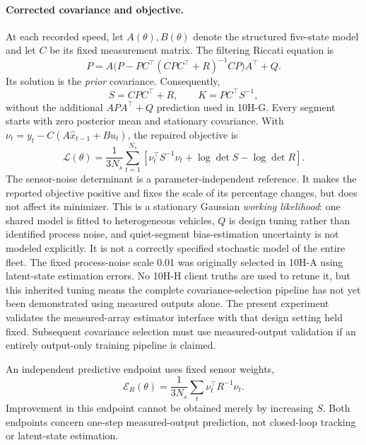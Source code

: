 \paragraph{Corrected covariance and objective.}
At each recorded speed, let $A(\theta),B(\theta)$ denote the structured
five-state model and let $C$ be its fixed measurement matrix. The filtering
Riccati equation is
\begin{equation}
 P=A\bigl(P-PC^\top(CPC^\top+R)^{-1}CP\bigr)A^\top+Q.
\end{equation}
Its solution is the \emph{prior} covariance. Consequently,
\begin{equation}
 S=CPC^\top+R,\qquad K=PC^\top S^{-1},
\end{equation}
without the additional $APA^\top+Q$ prediction used in 10H-G.
Every segment starts with zero posterior mean and stationary covariance.
With $\nu_t=y_t-C(A\hat x_{t-1}+Bu_t)$, the repaired objective is
\begin{equation}
 \mathcal L(\theta)=\frac{1}{3N_s}
 \sum_{t=1}^{N_s}
 \left[\nu_t^\top S^{-1}\nu_t+\log\det S-\log\det R\right].
 \label{eq:10hh-likelihood}
\end{equation}
The sensor-noise determinant is a parameter-independent reference. It makes
the reported objective positive and fixes the scale of its percentage changes,
but does not affect its minimizer. This is a stationary Gaussian
\emph{working likelihood}: one shared model is fitted to heterogeneous
vehicles, $Q$ is design tuning rather than identified process noise, and
quiet-segment bias-estimation uncertainty is not modeled explicitly.
It is not a correctly specified stochastic model of the entire fleet.
The fixed process-noise scale 0.01 was originally selected in 10H-A using
latent-state estimation errors. No 10H-H client truths are used to retune it,
but this inherited tuning means the complete covariance-selection pipeline
has not yet been demonstrated using measured outputs alone. The present
experiment validates the measured-array estimator interface with that design
setting held fixed. Subsequent covariance selection must use measured-output
validation if an entirely output-only training pipeline is claimed.

An independent predictive endpoint uses fixed sensor weights,
\begin{equation}
 \mathcal E_R(\theta)=\frac{1}{3N_s}
 \sum_t \nu_t^\top R^{-1}\nu_t.
\end{equation}
Improvement in this endpoint cannot be obtained merely by increasing $S$.
Both endpoints concern one-step measured-output prediction, not closed-loop
tracking or latent-state estimation.

